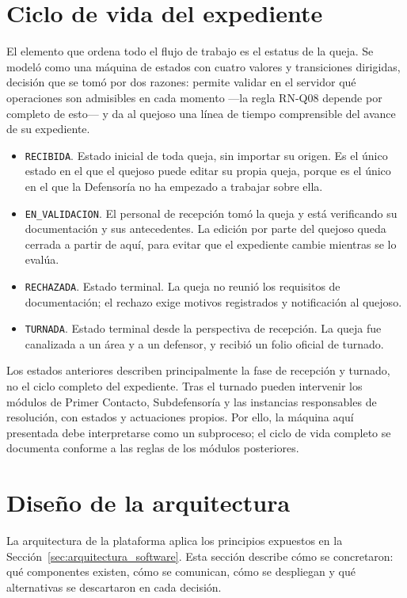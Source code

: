 	\section{Ciclo de vida del expediente}
	\label{sec:maquina_estados}
	El elemento que ordena todo el flujo de trabajo es el estatus de la queja. Se modeló como una
	máquina de estados con cuatro valores y transiciones dirigidas, decisión que se tomó por dos
	razones: permite validar en el servidor qué operaciones son admisibles en cada momento ---la
	regla RN-Q08 depende por completo de esto--- y da al quejoso una línea de tiempo comprensible
	del avance de su expediente.
	
	\begin{itemize}
		\item \texttt{RECIBIDA}. Estado inicial de toda queja, sin importar su origen. Es el único
		estado en el que el quejoso puede editar su propia queja, porque es el único en el que la
		Defensoría no ha empezado a trabajar sobre ella.
	
		\item \texttt{EN\_VALIDACION}. El personal de recepción tomó la queja y está verificando su
		documentación y sus antecedentes. La edición por parte del quejoso queda cerrada a partir de
		aquí, para evitar que el expediente cambie mientras se lo evalúa.
	
		\item \texttt{RECHAZADA}. Estado terminal. La queja no reunió los requisitos de
		documentación; el rechazo exige motivos registrados y notificación al quejoso.
	
		\item \texttt{TURNADA}. Estado terminal desde la perspectiva de recepción. La queja fue
		canalizada a un área y a un defensor, y recibió un folio oficial de turnado.
	\end{itemize}
	
	Los estados anteriores describen principalmente la fase de recepción y turnado, no el ciclo
	completo del expediente. Tras el turnado pueden intervenir los módulos de Primer Contacto,
	Subdefensoría y las instancias responsables de resolución, con estados y actuaciones propios.
	Por ello, la máquina aquí presentada debe interpretarse como un subproceso; el ciclo de vida
	completo se documenta conforme a las reglas de los módulos posteriores.
	
	\section{Diseño de la arquitectura}
	\label{sec:diseno_arquitectura}
	La arquitectura de la plataforma aplica los principios expuestos en la
	Sección~\ref{sec:arquitectura_software}. Esta sección describe cómo se concretaron: qué
	componentes existen, cómo se comunican, cómo se despliegan y qué alternativas se descartaron en
	cada decisión.
	
